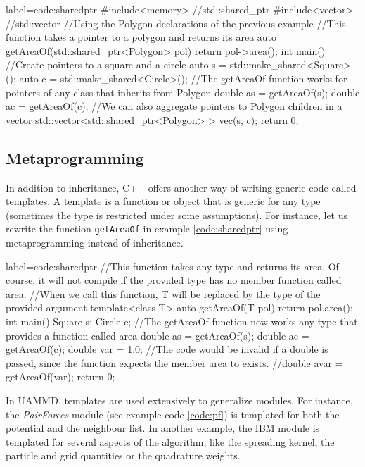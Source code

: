 \documentclass[ twoside,openright,titlepage,numbers=noenddot,%
headinclude,footinclude,cleardoublepage=empty,abstract=on,
BCOR=5mm,paper=b5,fontsize=11pt, dvipsnames
]{scrreprt}
\def\ucpp{uammd_cpp_lexer.py:UAMMDCppLexer -x}
\newcommand{\uammd}{\gls{UAMMD}\xspace}
\begin{document}
\begin{code2} {label=code:sharedptr}
  #include<memory> //std::shared_ptr
  #include<vector> //std::vector
  //Using the Polygon declarations of the previous example
  //This function takes a pointer to a polygon and returns its area
  auto getAreaOf(std::shared_ptr<Polygon> pol){
    return pol->area();
  }
  int main(){
    //Create pointers to a square and a circle
    auto s = std::make_shared<Square>();
    auto c = std::make_shared<Circle>();
    //The getAreaOf function works for pointers of any class that inherits from Polygon
    double as = getAreaOf(s);
    double ac = getAreaOf(c);
    //We can also aggregate pointers to Polygon children in a vector
    std::vector<std::shared_ptr<Polygon> > vec({s, c});
    return 0;  
  }
\end{code2}

\subsection*{Metaprogramming}
In addition to inheritance, C++ offers another way of writing generic code called templates. A template is a function or object that is generic for any type (sometimes the type is restricted under some assumptions). For instance, let us rewrite the function \texttt{getAreaOf} in example \ref{code:sharedptr} using metaprogramming instead of inheritance.

\begin{code2} {label=code:sharedptr}
  //This function takes any type and returns its area. Of course, it will not compile if the provided type has no member function called area.
  //When we call this function, T will be replaced by the type of the provided argument
  template<class T>
  auto getAreaOf(T pol){
    return pol.area();
  }
  int main(){
    Square s;
    Circle c;
    //The getAreaOf function now works any type that provides a function called area
    double as = getAreaOf(s);
    double ac = getAreaOf(c);    
    double var = 1.0;
    //The code would be invalid if a double is passed, since the function expects the member area to exists.
    //double avar = getAreaOf(var);
    return 0;  
  }
\end{code2}

In \uammd, templates are used extensively to generalize modules. For instance, the \emph{PairForces} module (see example code \ref{code:pf}) is templated for both the potential and the neighbour list. In another example, the \gls{IBM} module is templated for several aspects of the algorithm, like the spreading kernel, the particle and grid quantities or the quadrature weights.
\end{document}
